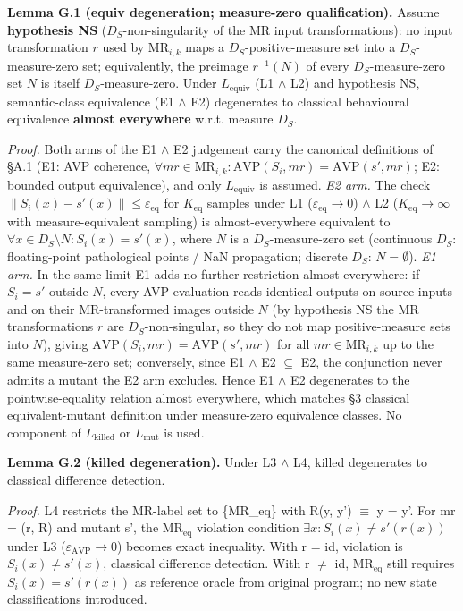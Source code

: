 \documentclass[manuscript,screen,review]{acmart}
\begin{document}
\textbf{Lemma G.1 (equiv degeneration; measure-zero
qualification).} Assume \textbf{hypothesis NS} ($D_S$-non-singularity of
the MR input transformations): no input transformation $r$ used by
$\mathrm{MR}_{i,k}$ maps a $D_S$-positive-measure set into a
$D_S$-measure-zero set; equivalently, the preimage $r^{-1}(N)$ of every
$D_S$-measure-zero set $N$ is itself $D_S$-measure-zero. Under
$L_{\mathrm{equiv}}$ (L1 $\wedge$ L2) and hypothesis NS, semantic-class equivalence
(E1 $\wedge$ E2) degenerates to classical behavioural equivalence
\textbf{almost everywhere} w.r.t. measure $D_S$.

\emph{Proof.} Both arms of the E1 $\wedge$ E2 judgement carry the
canonical definitions of §A.1 (E1: AVP coherence,
$\forall \mathit{mr} \in \mathrm{MR}_{i,k}: \mathrm{AVP}(S_i, \mathit{mr}) = \mathrm{AVP}(s', \mathit{mr})$;
E2: bounded output equivalence), and only $L_{\mathrm{equiv}}$ is
assumed. \emph{E2 arm.} The check
$\|S_i(x) - s'(x)\| \leq \varepsilon_{\mathrm{eq}}$ for $K_{\mathrm{eq}}$ samples
under L1 ($\varepsilon_{\mathrm{eq}} \to 0$) $\wedge$ L2 ($K_{\mathrm{eq}} \to \infty$ with measure-equivalent sampling)
is almost-everywhere equivalent to $\forall x \in D_S \setminus N: S_i(x) = s'(x)$, where
$N$ is a $D_S$-measure-zero set (continuous $D_S$: floating-point
pathological points / NaN propagation; discrete $D_S$: $N = \emptyset$).
\emph{E1 arm.} In the same limit E1 adds no further restriction almost
everywhere: if $S_i = s'$ outside $N$, every AVP evaluation reads
identical outputs on source inputs and on their MR-transformed images
outside $N$ (by hypothesis NS the MR transformations $r$ are
$D_S$-non-singular, so they do not map positive-measure sets into $N$), giving
$\mathrm{AVP}(S_i, \mathit{mr}) = \mathrm{AVP}(s', \mathit{mr})$ for all
$\mathit{mr} \in \mathrm{MR}_{i,k}$ up to the same measure-zero set;
conversely, since E1 $\wedge$ E2 $\subseteq$ E2, the conjunction never
admits a mutant the E2 arm excludes. Hence E1 $\wedge$ E2 degenerates
to the pointwise-equality relation almost everywhere, which
matches \citet{jia2011analysis} §3 classical equivalent-mutant definition
under measure-zero equivalence classes. No component of
$L_{\mathrm{killed}}$ or $L_{\mathrm{mut}}$ is used.

\textbf{Lemma G.2 (killed degeneration).} Under L3 $\wedge$ L4, killed
degenerates to classical difference detection.

\emph{Proof.} L4 restricts the MR-label set to \{MR\_eq\} with R(y, y') $\equiv$ y = y'. For
mr = (r, R) and mutant s', the $\mathrm{MR}_{\mathrm{eq}}$ violation condition $\exists x: S_i(x) \neq
s'(r(x))$ under L3 ($\varepsilon_{\mathrm{AVP}} \to 0$) becomes exact inequality. With r = id,
violation is $S_i(x) \neq s'(x)$, classical difference detection. With r
$\neq$ id, $\mathrm{MR}_{\mathrm{eq}}$ still requires $S_i(x) = s'(r(x))$ as reference oracle from
original program; no new state classifications introduced.
\end{document}
